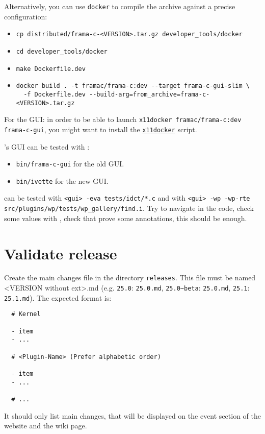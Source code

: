 \noindent Alternatively, you can use \texttt{docker} to compile the archive against a
precise configuration:
\begin{itemize}
  \item \verb+cp distributed/frama-c-<VERSION>.tar.gz developer_tools/docker+
  \item \verb+cd developer_tools/docker+
  \item \verb+make Dockerfile.dev+
  \item \verb+docker build . -t framac/frama-c:dev --target frama-c-gui-slim \+\\
        \verb+  -f Dockerfile.dev --build-arg=from_archive=frama-c-<VERSION>.tar.gz+
\end{itemize}
For the GUI: in order to be able to launch \verb+x11docker framac/frama-c:dev frama-c-gui+,
you might want to install the
\href{https://github.com/mviereck/x11docker}{\texttt{x11docker}} script.

\noindent \FramaC's GUI can be tested with :
\begin{itemize}
  \item \texttt{bin/frama-c-gui} for the old GUI.
  \item \texttt{bin/ivette} for the new GUI.
\end{itemize}
\Eva can be tested with \texttt{<gui> -eva tests/idct/*.c} and \Wp with
\texttt{<gui> -wp -wp-rte src/plugins/wp/tests/wp\_gallery/find.i}. Try to
navigate in the code, check some values with \Eva, check that \Wp prove some
annotations, this should be enough.

\section{Validate release}

Create the main changes file in the directory \texttt{releases}. This file must
be named <VERSION without ext>.md (e.g. \texttt{25.0}: \texttt{25.0.md},
\texttt{25.0\~{}beta}: \texttt{25.0.md}, \texttt{25.1}: \texttt{25.1.md}). The
expected format is:

\begin{lstlisting}
  # Kernel

  - item
  - ...

  # <Plugin-Name> (Prefer alphabetic order)

  - item
  - ...

  # ...
\end{lstlisting}

It should only list main changes, that will be displayed on the event section of
the website and the wiki page.

